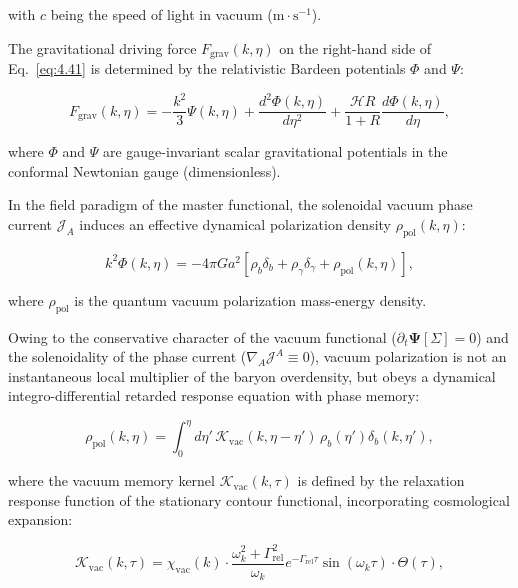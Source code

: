 \documentclass[11pt,a4paper]{article}
\theoremstyle{definition}
\begin{document}
with $c$ being the speed of light in vacuum ($\text{m}\cdot\text{s}^{-1}$).

The gravitational driving force $F_{\text{grav}}(k, \eta)$ on the right-hand side of Eq.~\eqref{eq:4.41} is determined by the relativistic Bardeen potentials $\Phi$ and $\Psi$:

\begin{equation}\label{eq:4.44}\tag{4.44}
F_{\text{grav}}(k, \eta) = - \frac{k^2}{3} \Psi(k, \eta) + \frac{d^2 \Phi(k, \eta)}{d\eta^2} + \frac{\mathcal{H} R}{1+R} \frac{d\Phi(k, \eta)}{d\eta},
\end{equation}

where $\Phi$ and $\Psi$ are gauge-invariant scalar gravitational potentials in the conformal Newtonian gauge (dimensionless).

In the field paradigm of the master functional, the solenoidal vacuum phase current $\mathcal{J}_A$ induces an effective dynamical polarization density $\rho_{\text{pol}}(k, \eta)$:

\begin{equation}\label{eq:4.45}\tag{4.45}
k^2 \Phi(k, \eta) = - 4\pi G a^2 \left[ \rho_b \delta_b + \rho_\gamma \delta_\gamma + \rho_{\text{pol}}(k, \eta) \right],
\end{equation}

where $\rho_{\text{pol}}$ is the quantum vacuum polarization mass-energy density.

Owing to the conservative character of the vacuum functional ($\partial_t \mathbf{\Psi}[\Sigma] = 0$) and the solenoidality of the phase current ($\nabla_A \mathcal{J}^A \equiv 0$), vacuum polarization is not an instantaneous local multiplier of the baryon overdensity, but obeys a dynamical integro-differential retarded response equation with phase memory:

\begin{equation}\label{eq:4.46}\tag{4.46}
\rho_{\text{pol}}(k, \eta) = \int_0^\eta d\eta' \, \mathcal{K}_{\text{vac}}(k, \eta - \eta') \, \rho_b(\eta') \delta_b(k, \eta'),
\end{equation}

where the vacuum memory kernel $\mathcal{K}_{\text{vac}}(k, \tau)$ is defined by the relaxation response function of the stationary contour functional, incorporating cosmological expansion:

\begin{equation}\label{eq:4.47}\tag{4.47}
\mathcal{K}_{\text{vac}}(k, \tau) = \chi_{\text{vac}}(k) \cdot \frac{\omega_k^2 + \Gamma_{\text{rel}}^2}{\omega_k} e^{-\Gamma_{\text{rel}} \tau} \sin(\omega_k \tau) \cdot \Theta(\tau),
\end{equation}
\end{document}
